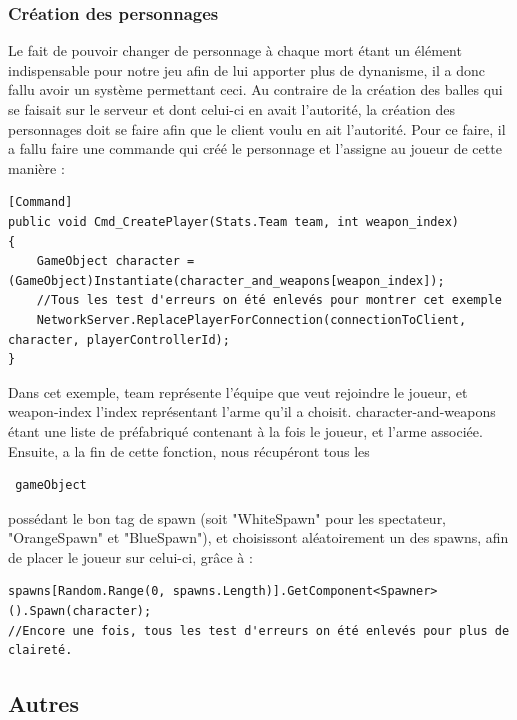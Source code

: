 ﻿\documentclass[12pt]{article}
\begin{document}
\subsubsection {Création des personnages}
Le fait de pouvoir changer de personnage à chaque mort étant un élément indispensable pour notre jeu afin de lui apporter
plus de dynanisme, il a donc fallu avoir un système permettant ceci.
Au contraire de la création des balles qui se faisait sur le serveur et dont celui-ci en avait l'autorité, la création
des personnages doit se faire afin que le client voulu en ait l'autorité.
Pour ce faire, il a fallu faire une commande qui créé le personnage et l'assigne au joueur de cette manière :
\begin{verbatim}
[Command]
public void Cmd_CreatePlayer(Stats.Team team, int weapon_index)
{
    GameObject character = (GameObject)Instantiate(character_and_weapons[weapon_index]);
    //Tous les test d'erreurs on été enlevés pour montrer cet exemple
    NetworkServer.ReplacePlayerForConnection(connectionToClient, character, playerControllerId);
}
\end{verbatim}
Dans cet exemple, team représente l'équipe que veut rejoindre le joueur, et weapon-index l'index représentant
l'arme qu'il a choisit. character-and-weapons étant une liste de préfabriqué contenant à la fois le joueur, et l'arme associée.
Ensuite, a la fin de cette fonction, nous récupéront tous les \begin{verbatim} gameObject \end{verbatim} possédant le bon
tag de spawn (soit "WhiteSpawn" pour les spectateur, "OrangeSpawn" et "BlueSpawn"), et choisissont aléatoirement un des spawns,
afin de placer le joueur sur celui-ci, grâce à :
\begin{verbatim}
spawns[Random.Range(0, spawns.Length)].GetComponent<Spawner>().Spawn(character);
//Encore une fois, tous les test d'erreurs on été enlevés pour plus de claireté.
\end{verbatim}

\subsection {Autres}
\end{document}

